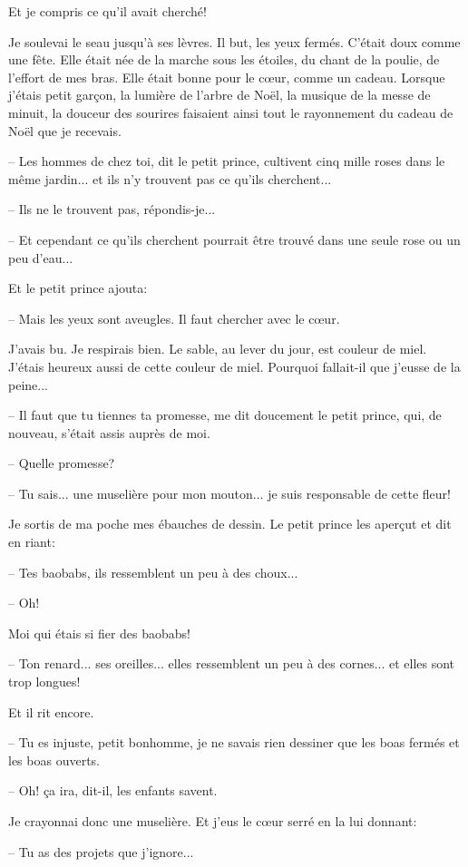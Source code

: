 \documentclass[a4paper]{report}
\begin{document}
Et je compris ce qu'il avait cherché!

Je soulevai le seau jusqu'à ses lèvres. Il but, les yeux fermés. C'était doux comme une fête. Elle était née de la marche sous les étoiles, du chant de la poulie, de l'effort de mes bras. Elle était bonne pour le cœur, comme un cadeau. Lorsque j'étais petit garçon, la lumière de l'arbre de Noël, la musique de la messe de minuit, la douceur des sourires faisaient ainsi tout le rayonnement du cadeau de Noël que je recevais.

-- Les hommes de chez toi, dit le petit prince, cultivent cinq mille roses dans le même jardin... et ils n'y trouvent pas ce qu'ils cherchent...

-- Ils ne le trouvent pas, répondis-je...

-- Et cependant ce qu'ils cherchent pourrait être trouvé dans une seule rose ou un peu d'eau...

Et le petit prince ajouta:

-- Mais les yeux sont aveugles. Il faut chercher avec le cœur.

J'avais bu. Je respirais bien. Le sable, au lever du jour, est couleur de miel. J'étais heureux aussi de cette couleur de miel. Pourquoi fallait-il que j'eusse de la peine...

-- Il faut que tu tiennes ta promesse, me dit doucement le petit prince, qui, de nouveau, s'était assis auprès de moi.

-- Quelle promesse?

-- Tu sais... une muselière pour mon mouton... je suis responsable de cette fleur!

Je sortis de ma poche mes ébauches de dessin. Le petit prince les aperçut et dit en riant:

-- Tes baobabs, ils ressemblent un peu à des choux...

-- Oh!

Moi qui étais si fier des baobabs!

-- Ton renard... ses oreilles... elles ressemblent un peu à des cornes... et elles sont trop longues!

Et il rit encore.

-- Tu es injuste, petit bonhomme, je ne savais rien dessiner que les boas fermés et les boas ouverts.

-- Oh! ça ira, dit-il, les enfants savent.

Je crayonnai donc une muselière. Et j'eus le cœur serré en la lui donnant:

-- Tu as des projets que j'ignore...
\end{document}
